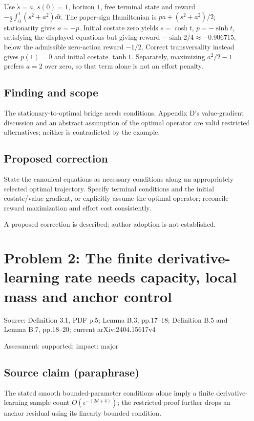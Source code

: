 \documentclass[11pt]{article}
\begin{document}
Use \(\dot s=a\), \(s(0)=1\), horizon \(1\), free terminal state and reward \(-\tfrac12\int_0^1(s^2+a^2)dt\). The paper-sign Hamiltonian is \(pa+(s^2+a^2)/2\); stationarity gives \(a=-p\). Initial costate zero yields \(s=\cosh t\), \(p=-\sinh t\), satisfying the displayed equations but giving reward \(-\sinh2/4\approx-0.906715\), below the admissible zero-action reward \(-1/2\). Correct transversality instead gives \(p(1)=0\) and initial costate \(\tanh1\). Separately, maximizing \(a^2/2-1\) prefers \(a=2\) over zero, so that term alone is not an effort penalty.

\subsection*{Finding and scope}

The stationary-to-optimal bridge needs conditions. Appendix D’s value-gradient discussion and an abstract assumption of the optimal operator are valid restricted alternatives; neither is contradicted by the example.

\subsection*{Proposed correction}

State the canonical equations as necessary conditions along an appropriately selected optimal trajectory. Specify terminal conditions and the initial costate/value gradient, or explicitly assume the optimal operator; reconcile reward maximization and effort cost consistently.

A proposed correction is described; author adoption is not established.

\section*{Problem 2: The finite derivative-learning rate needs capacity, local mass and anchor control}

Source: Definition 3.1, PDF p.5; Lemma B.3, pp.17–18; Definition B.5 and Lemma B.7, pp.18–20; current arXiv:2404.15617v4

Assessment: supported; impact: major

\subsection*{Source claim (paraphrase)}

The stated smooth bounded-parameter conditions alone imply a finite derivative-learning sample count \(O(\epsilon^{-(2d+4)})\); the restricted proof further drops an anchor residual using its linearly bounded condition.
\end{document}
